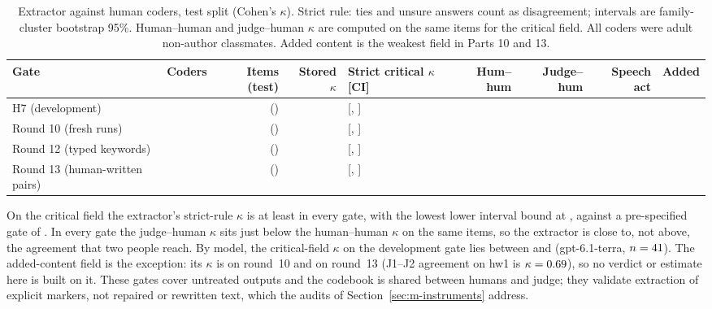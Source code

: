 \begin{table}[t]
\caption{Extractor against human coders, test split (Cohen's $\kappa$). Strict rule: ties and unsure answers count as disagreement; intervals are family-cluster bootstrap 95\%. Human--human and judge--human $\kappa$ are computed on the same items for the critical field. All coders were adult non-author classmates. Added content is the weakest field in Parts 10 and 13.}
\label{tab:gates}
\footnotesize
\setlength{\tabcolsep}{2.5pt}
\begin{tabular}{@{}l r r r l r r r r@{}}
\toprule
Gate & Coders & Items (test) & Stored $\kappa$ & Strict critical $\kappa$ [CI] & Hum--hum & Judge--hum & Speech act & Added\\
\midrule
H7 (development) & \jmhgHSevenCoders{} & \jmhgHSevenSampled{} (\jmhgHSevenTest{}) & \jmhgHSevenCritRZero{} & \jmhgHSevenCrit{} [\jmhgHSevenCritLo{}, \jmhgHSevenCritHi{}] & \jmhgHSevenHH{} & \jmhgHSevenJH{} & \jmhgHSevenAct{} & \jmhgHSevenAdded{}\\
Round 10 (fresh runs) & \jmhgPTenCoders{} & \jmhgPTenSampled{} (\jmhgPTenTest{}) & \jmhgPTenCritRZero{} & \jmhgPTenCrit{} [\jmhgPTenCritLo{}, \jmhgPTenCritHi{}] & \jmhgPTenHH{} & \jmhgPTenJH{} & \jmhgPTenAct{} & \jmhgPTenAdded{}\\
Round 12 (typed keywords) & \jmhgPTwelveCoders{} & \jmhgPTwelveSampled{} (\jmhgPTwelveTest{}) & \jmhgPTwelveCritRZero{} & \jmhgPTwelveCrit{} [\jmhgPTwelveCritLo{}, \jmhgPTwelveCritHi{}] & \jmhgPTwelveHH{} & \jmhgPTwelveJH{} & \jmhgPTwelveAct{} & \jmhgPTwelveAdded{}\\
Round 13 (human-written pairs) & \jmhgPThirteenCoders{} & \jmhgPThirteenSampled{} (\jmhgPThirteenTest{}) & \jmhgPThirteenCritRZero{} & \jmhgPThirteenCrit{} [\jmhgPThirteenCritLo{}, \jmhgPThirteenCritHi{}] & \jmhgPThirteenHH{} & \jmhgPThirteenJH{} & \jmhgPThirteenAct{} & \jmhgPThirteenAdded{}\\
\bottomrule
\end{tabular}
\end{table}

On the critical field the extractor's strict-rule $\kappa$ is at least \jmhgCritMin{} in every gate, with the lowest lower interval bound at \jmhgCritLoMin{}, against a pre-specified gate of \jmhgGate{}.
In every gate the judge--human $\kappa$ sits just below the human--human $\kappa$ on the same items, so the extractor is close to, not above, the agreement that two people reach.
By model, the critical-field $\kappa$ on the development gate lies between \jmhgHSevenModelMin{} and \jmhgHSevenTerra{} (gpt-6.1-terra, $n=41{}$).
The added-content field is the exception: its $\kappa$ is \jmhgPTenAdded{} on round~10 and \jmhgPThirteenAdded{} on round~13 (J1--J2 agreement on hw1 is $\kappa=0.69{}$), so no verdict or estimate here is built on it.
These gates cover untreated outputs and the codebook is shared between humans and judge; they validate extraction of explicit markers, not repaired or rewritten text, which the audits of Section~\ref{sec:m-instruments} address.


